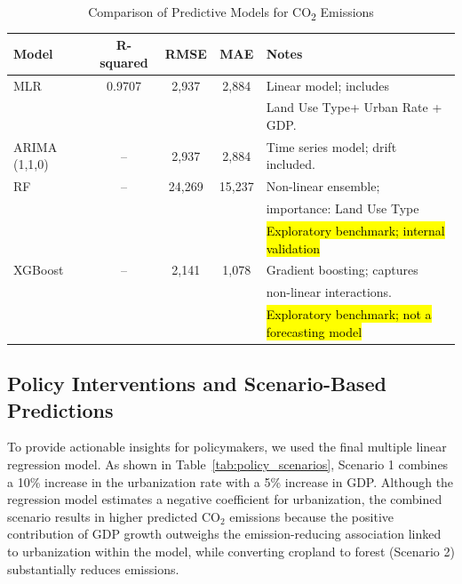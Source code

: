 \documentclass[10pt,letterpaper]{article}
\begin{document}
\begin{table}[h!]
	\centering
	\caption{Comparison of Predictive Models for CO\textsubscript{2} Emissions}
	\label{tab:model_comparison1}
	\begin{tabular}{lcccl}
		\hline
		\textbf{Model} & \textbf{R-squared} & \textbf{RMSE} & \textbf{MAE} & \textbf{Notes} \\
		\hline
		MLR & 0.9707 & 2,937 & 2,884 & Linear model; includes  \\ & & & &Land Use Type+ Urban Rate + GDP. \\
		ARIMA (1,1,0) & -- & 2,937 & 2,884 & Time series model; drift included. \\
		RF & -- & 24,269 & 15,237 & Non-linear ensemble;\\ & & & & importance: Land Use Type\\ & & & & \hl{Exploratory benchmark; internal validation} \\
		XGBoost & -- & 2,141 & 1,078 & Gradient boosting; captures\\ & & & & non-linear interactions.\\ & & & & \hl{Exploratory benchmark; not a forecasting model} \\
		\hline
	\end{tabular}
\end{table}



\subsection{Policy Interventions and Scenario-Based Predictions}

To provide actionable insights for policymakers, we used the final multiple linear regression model. As shown in Table~\ref{tab:policy_scenarios}, Scenario 1 combines a 10\% increase in the urbanization rate with a 5\% increase in GDP. Although the regression model estimates a negative coefficient for urbanization, the combined scenario results in higher predicted CO$_2$ emissions because the positive contribution of GDP growth outweighs the emission-reducing association linked to urbanization within the model, while converting cropland to forest (Scenario 2) substantially reduces emissions. 
\end{document}
